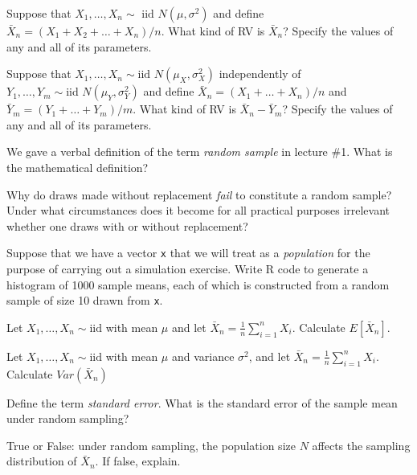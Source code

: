 \documentclass[addpoints,12pt]{exam}
\begin{document}
\begin{questions}

\question Suppose that $X_1, \dots, X_n \sim \text{ iid } N(\mu, \sigma^2)$ and define $\bar{X}_n = (X_1 + X_2 + \dots + X_n) / n$.
What kind of RV is $\bar{X}_n$?
Specify the values of any and all of its parameters.


\question Suppose that $X_1, \dots, X_n \sim \text{iid } N(\mu_X, \sigma_X^2)$ independently of $Y_1, \dots, Y_m \sim \text{iid } N(\mu_Y, \sigma^2_Y)$ and define $\bar{X}_n = (X_1 + \dots + X_n)/n$ and $\bar{Y}_m = (Y_1 + \dots + Y_m)/m$.
What kind of RV is $\bar{X}_n - \bar{Y}_m$? 
Specify the values of any and all of its parameters.


\question We gave a verbal definition of the term \emph{random sample} in lecture \#1. What is the mathematical definition?

\question Why do draws made without replacement \emph{fail} to constitute a random sample? Under what circumstances does it become for all practical purposes irrelevant whether one draws with or without replacement?

\question Suppose that we have a vector \texttt{x} that we will treat as a \emph{population} for the purpose of carrying out a simulation exercise.
Write R code to generate a histogram of 1000 sample means, each of which is constructed from a random sample of size 10 drawn from \texttt{x}.

\question Let $X_1, \dots, X_n \sim \text{iid}$ with mean $\mu$ and let $\bar{X}_n = \frac{1}{n}\sum_{i=1}^n X_i$. Calculate $E[\bar{X}_n]$.

\question Let $X_1, \dots, X_n \sim \text{iid}$ with mean $\mu$ and variance $\sigma^2$, and let $\bar{X}_n = \frac{1}{n}\sum_{i=1}^n X_i$. Calculate $Var(\bar{X}_n)$

\question Define the term \emph{standard error}. What is the standard error of the sample mean under random sampling?

\question True or False: under random sampling, the population size $N$ affects the sampling distribution of $\bar{X}_n$. If false, explain.


\end{questions}
\end{document}

